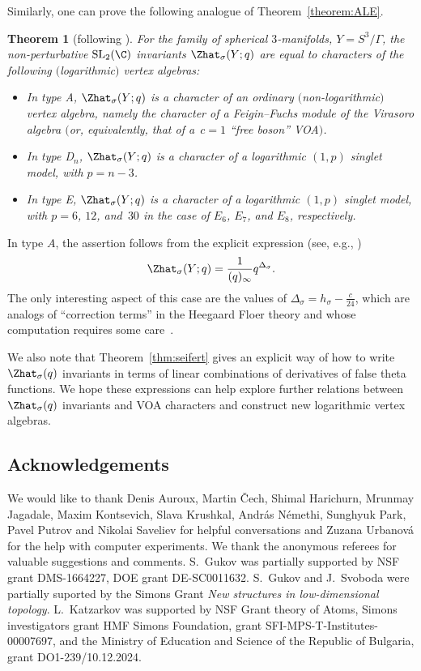\documentclass[pdftex]{sigma}
\newtheorem{Theorem}{Theorem}[section]
\begin{document}
Similarly, one can prove the following analogue of Theorem~\ref{theorem:ALE}.
%
\begin{Theorem}[following \cite{CCFFGHP22}]
	For the family of spherical $3$-manifolds, $Y = S^3 / \Gamma$, the non-perturbative $\operatorname{SL}_2(\C)$ invariants $\Zhat_{\sigma} (Y; q)$ are equal to characters of the following $($logarithmic$)$ vertex algebras:
	\begin{itemize}\itemsep=0pt
\item In type A, $\Zhat_{\sigma} (Y; q)$ is a character of an ordinary $($non-logarithmic$)$ vertex algebra, namely the character of a Feigin--Fuchs module of the Virasoro algebra $($or, equivalently, that of a~${c = 1}$ ``free boson'' VOA$)$.

		\item In type D$_n$, $\Zhat_{\sigma} (Y; q)$ is a character of a logarithmic $(1, p)$ singlet model, with $p = n-3$.

		\item In type E, $\Zhat_{\sigma} (Y; q)$ is a character of a logarithmic $(1, p)$ singlet model, with $p = 6$, $12$, and~$30$ in the case of $E_6$, $E_7$, and $E_8$, respectively.

	\end{itemize}
\end{Theorem}

\begin{Remark}
	In type $A$, the assertion follows from the explicit expression (see, e.g., \cite{GPV16})
	\[
		\Zhat_{\sigma} (Y; q) = \frac{1}{(q)_{\infty}} q^{\Delta_\sigma}.
	\]
	The only interesting aspect of this case are the values of $\Delta_\sigma = h_\sigma - \frac{c}{24}$, which are analogs of ``correction terms'' in the Heegaard Floer theory and whose computation requires some care~\mbox{\cite{AJK21, GPP20}}.
\end{Remark}
We also note that Theorem~\ref{thm:seifert} gives an explicit way of how to write $\Zhat_{\sigma} (q)$ invariants in terms of linear combinations of derivatives of false theta functions. We hope these expressions can help explore further relations between $\Zhat_{\sigma} (q)$ invariants and VOA characters and construct new logarithmic vertex algebras.


\subsection*{Acknowledgements}

We would like to thank Denis Auroux, Martin \v{C}ech, Shimal Harichurn, Mrunmay Jagadale, Maxim Kontsevich, Slava Krushkal, Andr\'as N\'emethi, Sunghyuk Park, Pavel Putrov and Nikolai Saveliev for helpful conversations and Zuzana Urbanov\'a for the help with computer experiments. We thank the anonymous referees for valuable suggestions and comments.
S.~Gukov was partially
supported by NSF grant DMS-1664227, DOE grant DE-SC0011632. S.~Gukov and J.~Svoboda were partially suported by the Simons Grant {\it New structures in low-dimensional topology}.
L.~Katzarkov was supported by NSF Grant theory of Atoms, Simons investigators grant
HMF Simons Foundation, grant SFI-MPS-T-Institutes-00007697, and the Ministry of Education and Science of the Republic of Bulgaria, grant DO1-239/10.12.2024.
\end{document}
